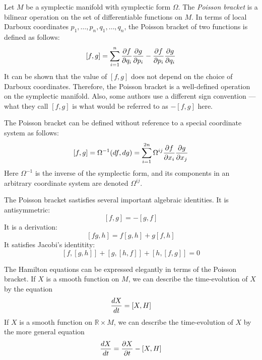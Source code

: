\documentclass[12pt]{article}
\begin{document}
Let $M$ be a symplectic manifold with symplectic form $\Omega$.  The \emph{Poisson bracket} is a bilinear operation on the set of differentiable functions on $M$.  In terms of local Darboux coordinates $p_1, \ldots, p_n, q_1, \ldots, q_n$, the Poisson bracket of two functions is defined as follows:
 $$[f,g] = \sum_{i=1}^n {\partial f \over \partial q_i} {\partial g \over \partial p_i} - {\partial f \over \partial p_i} {\partial g \over \partial q_i}$$
It can be shown that the value of $[f,g]$ does not depend on the choice of Darboux coordinates.  Therefore, the Poisson bracket is a well-defined operation on the symplectic manifold.  Also, some authors use a different sign convention --- what they call $[f,g]$ is what would be referred to as $-[f,g]$ here.

The Poisson bracket can be defined without reference to a special coordinate system as follows:
 $$[f,g] = \Omega^{-1} (df, dg) = \sum_{i=1}^{2n} \Omega^{ij} {\partial f \over \partial x_i} {\partial g \over \partial x_j}$$
Here $\Omega^{-1}$ is the inverse of the symplectic form, and its components in an arbitrary coordinate system are denoted $\Omega^{ij}$.

The Poisson bracket sastisfies several important algebraic identities.  It is antisymmetric:
 $$[f,g] = -[g,f]$$
It is a derivation:
 $$[fg,h] = f[g,h] + g[f,h]$$
It satisfies Jacobi's identitity:
 $$[f,[g,h]] + [g,[h,f]] + [h,[f,g]] = 0$$

The Hamilton equations can be expressed elegantly in terms of the Poisson bracket.  If $X$ is a smooth function on $M$, we can describe the time-evolution of $X$ by the equation
 $${dX \over dt} = [X,H]$$
If $X$ is a smooth function on $\mathbb{R} \times M$, we can describe the time-evolution of $X$ by the more general equation
 $${dX \over dt} = {\partial X \over \partial t} - [X,H]$$
\end{document}
